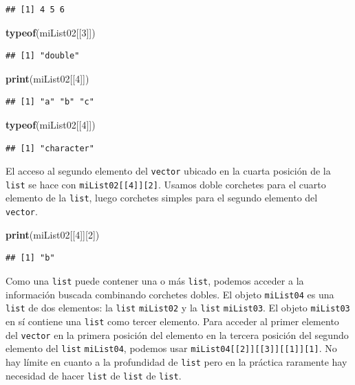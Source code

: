 \documentclass[
]{book}
\newenvironment{Shaded}{\begin{snugshade}}{\end{snugshade}}
\newcommand{\DecValTok}[1]{\textcolor[rgb]{0.00,0.00,0.81}{#1}}
\newcommand{\KeywordTok}[1]{\textcolor[rgb]{0.13,0.29,0.53}{\textbf{#1}}}
\newcommand{\NormalTok}[1]{#1}
\begin{document}
\begin{verbatim}
## [1] 4 5 6
\end{verbatim}

\begin{Shaded}
\begin{Highlighting}[]
\KeywordTok{typeof}\NormalTok{(miList02[[}\DecValTok{3}\NormalTok{]])}
\end{Highlighting}
\end{Shaded}

\begin{verbatim}
## [1] "double"
\end{verbatim}

\begin{Shaded}
\begin{Highlighting}[]
\KeywordTok{print}\NormalTok{(miList02[[}\DecValTok{4}\NormalTok{]])}
\end{Highlighting}
\end{Shaded}

\begin{verbatim}
## [1] "a" "b" "c"
\end{verbatim}

\begin{Shaded}
\begin{Highlighting}[]
\KeywordTok{typeof}\NormalTok{(miList02[[}\DecValTok{4}\NormalTok{]])}
\end{Highlighting}
\end{Shaded}

\begin{verbatim}
## [1] "character"
\end{verbatim}

El acceso al segundo elemento del \texttt{vector} ubicado en la cuarta posición de la \texttt{list} se hace con \texttt{miList02{[}{[}4{]}{]}{[}2{]}}. Usamos doble corchetes para el cuarto elemento de la \texttt{list}, luego corchetes simples para el segundo elemento del \texttt{vector}.

\begin{Shaded}
\begin{Highlighting}[]
\KeywordTok{print}\NormalTok{(miList02[[}\DecValTok{4}\NormalTok{]][}\DecValTok{2}\NormalTok{])}
\end{Highlighting}
\end{Shaded}

\begin{verbatim}
## [1] "b"
\end{verbatim}

Como una \texttt{list} puede contener una o más \texttt{list}, podemos acceder a la información buscada combinando corchetes dobles. El objeto \texttt{miList04} es una \texttt{list} de dos elementos: la \texttt{list} \texttt{miList02} y la \texttt{list} \texttt{miList03}. El objeto \texttt{miList03} en sí contiene una \texttt{list} como tercer elemento. Para acceder al primer elemento del \texttt{vector} en la primera posición del elemento en la tercera posición del segundo elemento del \texttt{list} \texttt{miList04}, podemos usar \texttt{miList04{[}{[}2{]}{]}{[}{[}3{]}{]}{[}{[}1{]}{]}{[}1{]}}. No hay límite en cuanto a la profundidad de \texttt{list} pero en la práctica raramente hay necesidad de hacer \texttt{list} de \texttt{list} de \texttt{list}.
\end{document}
